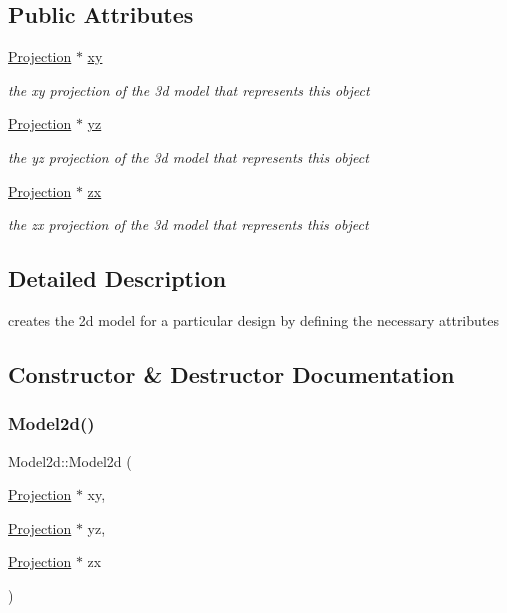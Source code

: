 \subsection*{Public Attributes}
\begin{DoxyCompactItemize}
\item 
\mbox{\hyperlink{class_projection}{Projection}} $\ast$ \mbox{\hyperlink{class_model2d_ad335c0d9899b23996a3f11e61be1d431}{xy}}
\begin{DoxyCompactList}\small\item\em the xy projection of the 3d model that represents this object \end{DoxyCompactList}\item 
\mbox{\hyperlink{class_projection}{Projection}} $\ast$ \mbox{\hyperlink{class_model2d_a4d012de876b8bb089bd226e41270df25}{yz}}
\begin{DoxyCompactList}\small\item\em the yz projection of the 3d model that represents this object \end{DoxyCompactList}\item 
\mbox{\hyperlink{class_projection}{Projection}} $\ast$ \mbox{\hyperlink{class_model2d_a6c459c26e4c89bbc11ac0149ea07b997}{zx}}
\begin{DoxyCompactList}\small\item\em the zx projection of the 3d model that represents this object \end{DoxyCompactList}\end{DoxyCompactItemize}


\subsection{Detailed Description}
creates the 2d model for a particular design by defining the necessary attributes 

\subsection{Constructor \& Destructor Documentation}
\mbox{\label{class_model2d_aa07204b20301739146f8ecf525778720}} 
\subsubsection{\texorpdfstring{Model2d()}{Model2d()}}
{\footnotesize\ttfamily Model2d\+::\+Model2d (\begin{DoxyParamCaption}\item[{\mbox{\hyperlink{class_projection}{Projection}} $\ast$}]{xy,  }\item[{\mbox{\hyperlink{class_projection}{Projection}} $\ast$}]{yz,  }\item[{\mbox{\hyperlink{class_projection}{Projection}} $\ast$}]{zx }\end{DoxyParamCaption})}



